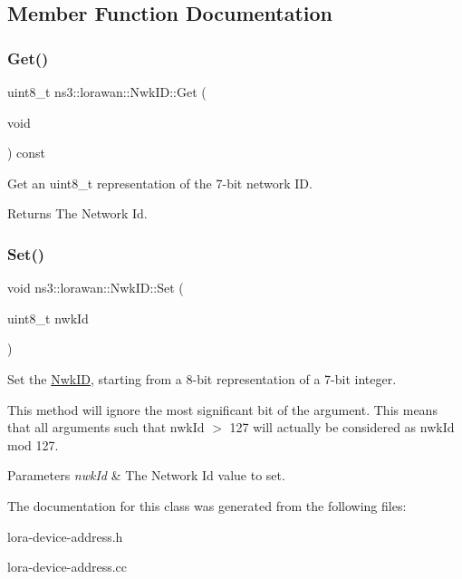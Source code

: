 \subsection{Member Function Documentation}
\mbox{\label{classns3_1_1lorawan_1_1NwkID_a3a80ac6b751d3a3df4ff4b2548ad8933}} 
\subsubsection{\texorpdfstring{Get()}{Get()}}
{\footnotesize\ttfamily uint8\+\_\+t ns3\+::lorawan\+::\+Nwk\+I\+D\+::\+Get (\begin{DoxyParamCaption}\item[{void}]{ }\end{DoxyParamCaption}) const}

Get an uint8\+\_\+t representation of the 7-\/bit network ID.

\begin{DoxyReturn}{Returns}
The Network Id. 
\end{DoxyReturn}
\mbox{\label{classns3_1_1lorawan_1_1NwkID_af1ec442f10512a4666e766bcd2e924eb}} 
\subsubsection{\texorpdfstring{Set()}{Set()}}
{\footnotesize\ttfamily void ns3\+::lorawan\+::\+Nwk\+I\+D\+::\+Set (\begin{DoxyParamCaption}\item[{uint8\+\_\+t}]{nwk\+Id }\end{DoxyParamCaption})}

Set the \hyperlink{classns3_1_1lorawan_1_1NwkID}{Nwk\+ID}, starting from a 8-\/bit representation of a 7-\/bit integer.

This method will ignore the most significant bit of the argument. This means that all arguments such that nwk\+Id $>$ 127 will actually be considered as nwk\+Id mod 127.


\begin{DoxyParams}{Parameters}
{\em nwk\+Id} & The Network Id value to set. \\
\hline
\end{DoxyParams}


The documentation for this class was generated from the following files\+:\begin{DoxyCompactItemize}
\item 
lora-\/device-\/address.\+h\item 
lora-\/device-\/address.\+cc\end{DoxyCompactItemize}
